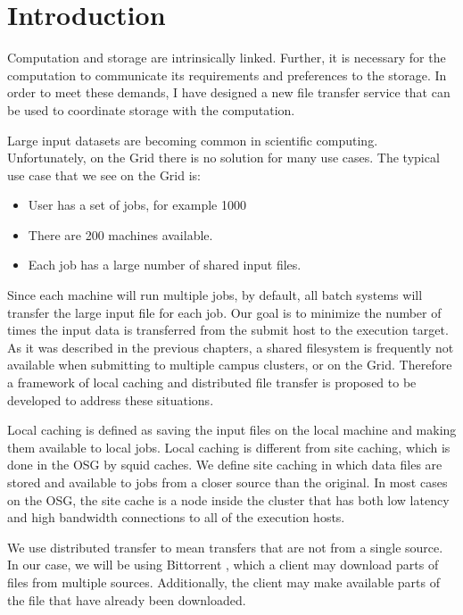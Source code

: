 \label{chapter:coordinatingstorage}


\section{Introduction}

Computation and storage are intrinsically linked.  Further, it is necessary for the computation to communicate its requirements and preferences to the storage.  In order to meet these demands, I have designed a new file transfer service that can be used to coordinate storage with the computation.  

Large input datasets are becoming common in scientific computing.  Unfortunately, on the Grid there is no solution for many use cases.  The typical use case that we see on the Grid is:

\begin{itemize}

\item User has a set of jobs, for example 1000
\item There are 200 machines available.
\item Each job has a large number of shared input files.

\end{itemize}

Since each machine will run multiple jobs, by default, all batch systems will transfer the large input file for each job.  Our goal is to minimize the number of times the input data is transferred from the submit host to the execution target.  As it was described in the previous chapters, a shared filesystem is frequently not available when submitting to multiple campus clusters, or on the Grid.  Therefore a framework of local caching and distributed file transfer is proposed to be developed to address these situations.

Local caching is defined as saving the input files on the local machine and making them available to local jobs.  Local caching is different from site caching, which is done in the OSG by squid caches.  We define site caching in which data files are stored and available to jobs from a closer source than the original.  In most cases on the OSG, the site cache is a node inside the cluster that has both low latency and high bandwidth connections to all of the execution hosts.

We use distributed transfer to mean transfers that are not from a single source.  In our case, we will be using Bittorrent \cite{cohen2008bittorrent}, which a client may download parts of files from multiple sources.  Additionally, the client may make available parts of the file that have already been downloaded.


